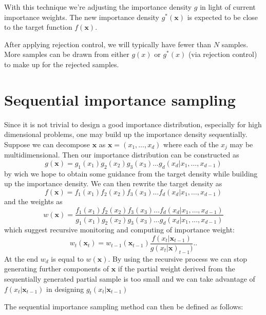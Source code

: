 \documentclass[times, utf8, diplomski]{fer}
\begin{document}
With this technique we're adjusting the importance density $g$  in light of current importance weights. The new importance density $g^{*}(\mathbf{x})$ is expected to be close to the target function $f(\mathbf{x})$.


After applying rejection control, we will typically have fewer than $N$ samples. More samples can be drawn from either $g(x)$ or $g^{*}(x)$ (via rejection control) to make up for the rejected samples. 

\section{Sequential importance sampling}
Since it is not trivial to design a good importance distribution, especially for high dimensional problems, one may build up the importance density sequentially. Suppose we can decompose $\mathbf{x}$ as $\mathbf{x} = (x_1, \ldots, x_d)$ where each of the $x_j$ may be multidimensional. Then our importance distribution can be constructed as 
\begin{equation*}
g(\mathbf{x}) = g_1(x_1) g_2(x_2) g_3(x_3) \ldots g_d(x_d | x_1, \ldots, x_{d - 1})
\end{equation*}
by wich we hope to obtain some guidance from the target density while building up the  importance density. We can then rewrite the target density as 
\begin{equation*}
f(\mathbf{x}) = f_1(x_1) f_2(x_2) f_3(x_3) \ldots f_d(x_d | x_1, \ldots, x_{d - 1})
\end{equation*}
and the weights as 
\begin{equation*}
w(\mathbf{x}) = \frac{f_1(x_1) f_2(x_2) f_3(x_3) \ldots f_d(x_d | x_1, \ldots, x_{d - 1})}{g_1(x_1) g_2(x_2) g_3(x_3) \ldots g_d(x_d | x_1, \ldots, x_{d - 1})}
\end{equation*}
which suggest recursive monitoring and computing of importance weight:
\begin{equation*}
w_t(\mathbf{x}_t) = w_{t - 1}(\mathbf{x}_{t - 1})\frac{f(x_t | \mathbf{x}_{t - 1})}{g(x_t | \mathbf{x})_{t - 1})}.         .
\end{equation*}
At the end $w_d$ is equal to $w(\mathbf{x})$. By using the recursive process we can stop generating further components of $\mathbf{x}$ if the partial weight derived from the sequentially generated partial sample is too small and we can take advantage of $f(x_t | \mathbf{x}_{t - 1})$ in designing $g_t(x_t | \mathbf{x}_{t - 1})$

The sequential importance sampling method can then be defined as follows:
\end{document}
